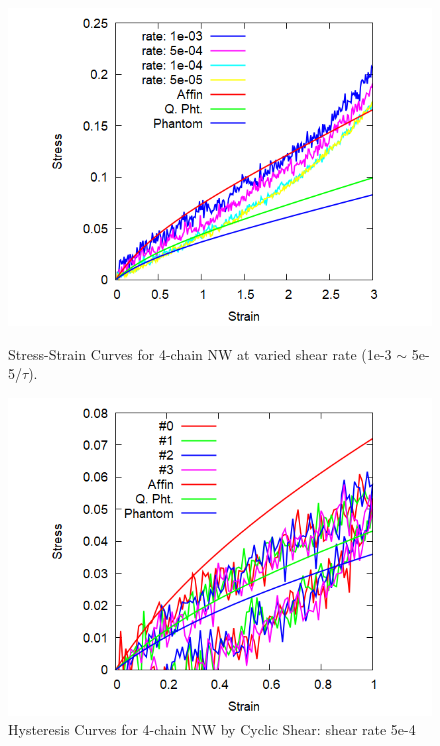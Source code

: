 \documentclass[uplatex,dvipdfmx,a4paper,10pt]{jsarticle}
\begin{document}
\begin{figure}[hb]
    \begin{minipage}{0.5\hsize}
        \begin{center}
        \includegraphics[width=.8\textwidth]{shear_random_4_N20.png}
        \caption{Stress-Strain Curves for 4-chain NW at varied shear rate (1e-3 $\sim$ 5e-5/$\tau$).}
        \label{fig:deform}
        \end{center}
    \end{minipage}
    \begin{minipage}{0.5\hsize}
        \begin{center}
        \includegraphics[width=.8\textwidth]{cyclic_shear_5e-4.png}
        \caption{Hysteresis Curves for 4-chain NW by Cyclic Shear: shear rate 5e-4}
        \label{fig:hyst}
        \end{center}
    \end{minipage}
\end{figure}
\end{document}
